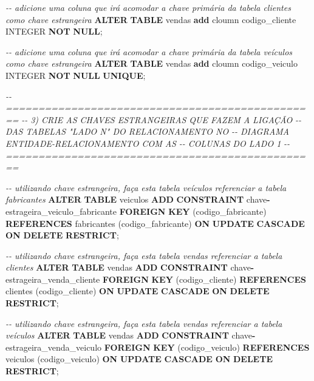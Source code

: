 \documentclass[
]{book}
\newenvironment{Shaded}{\begin{snugshade}}{\end{snugshade}}
\newcommand{\CommentTok}[1]{\textcolor[rgb]{0.56,0.35,0.01}{\textit{#1}}}
\newcommand{\DataTypeTok}[1]{\textcolor[rgb]{0.13,0.29,0.53}{#1}}
\newcommand{\KeywordTok}[1]{\textcolor[rgb]{0.13,0.29,0.53}{\textbf{#1}}}
\newcommand{\NormalTok}[1]{#1}
\newcommand{\OperatorTok}[1]{\textcolor[rgb]{0.81,0.36,0.00}{\textbf{#1}}}
\begin{document}
\begin{Shaded}
\begin{Highlighting}[]
\CommentTok{{-}{-} adicione uma coluna que irá acomodar a chave primária da tabela clientes como chave estrangeira}
\KeywordTok{ALTER} \KeywordTok{TABLE}\NormalTok{ vendas   }\KeywordTok{add}\NormalTok{ cloumn  codigo\_cliente      }\DataTypeTok{INTEGER} \KeywordTok{NOT} \KeywordTok{NULL}\NormalTok{;}

\CommentTok{{-}{-} adicione uma coluna que irá acomodar a chave primária da tabela veículos como chave estrangeira}
\KeywordTok{ALTER} \KeywordTok{TABLE}\NormalTok{ vendas   }\KeywordTok{add}\NormalTok{ cloumn  codigo\_veiculo      }\DataTypeTok{INTEGER} \KeywordTok{NOT} \KeywordTok{NULL} \KeywordTok{UNIQUE}\NormalTok{;}

\CommentTok{{-}{-} ================================================}
\CommentTok{{-}{-} 3) CRIE AS CHAVES ESTRANGEIRAS QUE FAZEM A LIGAÇÃO}
\CommentTok{{-}{-} DAS TABELAS "LADO N" DO RELACIONAMENTO NO }
\CommentTok{{-}{-} DIAGRAMA ENTIDADE{-}RELACIONAMENTO COM AS}
\CommentTok{{-}{-} COLUNAS DO LADO 1}
\CommentTok{{-}{-} ================================================}

\CommentTok{{-}{-} utilizando chave estrangeira, faça esta tabela veículos referenciar a tabela fabricantes}
\KeywordTok{ALTER} \KeywordTok{TABLE}\NormalTok{ veiculos}
    \KeywordTok{ADD} \KeywordTok{CONSTRAINT}\NormalTok{ chave}\OperatorTok{{-}}\NormalTok{estrageira\_veiculo\_fabricante}
    \KeywordTok{FOREIGN} \KeywordTok{KEY}\NormalTok{ (codigo\_fabricante)}
    \KeywordTok{REFERENCES}\NormalTok{ fabricantes (codigo\_fabricante)}
    \KeywordTok{ON} \KeywordTok{UPDATE} \KeywordTok{CASCADE}
    \KeywordTok{ON} \KeywordTok{DELETE} \KeywordTok{RESTRICT}\NormalTok{;}

\CommentTok{{-}{-} utilizando chave estrangeira, faça esta tabela vendas referenciar a tabela clientes}
\KeywordTok{ALTER} \KeywordTok{TABLE}\NormalTok{ vendas}
    \KeywordTok{ADD} \KeywordTok{CONSTRAINT}\NormalTok{ chave}\OperatorTok{{-}}\NormalTok{estrageira\_venda\_cliente}
    \KeywordTok{FOREIGN} \KeywordTok{KEY}\NormalTok{ (codigo\_cliente)}
    \KeywordTok{REFERENCES}\NormalTok{ clientes (codigo\_cliente)}
    \KeywordTok{ON} \KeywordTok{UPDATE} \KeywordTok{CASCADE}
    \KeywordTok{ON} \KeywordTok{DELETE} \KeywordTok{RESTRICT}\NormalTok{;}

\CommentTok{{-}{-} utilizando chave estrangeira, faça esta tabela vendas referenciar a tabela veículos }
\KeywordTok{ALTER} \KeywordTok{TABLE}\NormalTok{ vendas}
    \KeywordTok{ADD} \KeywordTok{CONSTRAINT}\NormalTok{ chave}\OperatorTok{{-}}\NormalTok{estrageira\_venda\_veiculo}
    \KeywordTok{FOREIGN} \KeywordTok{KEY}\NormalTok{ (codigo\_veiculo)}
    \KeywordTok{REFERENCES}\NormalTok{ veiculos (codigo\_veiculo)}
    \KeywordTok{ON} \KeywordTok{UPDATE} \KeywordTok{CASCADE}
    \KeywordTok{ON} \KeywordTok{DELETE} \KeywordTok{RESTRICT}\NormalTok{;}
\end{Highlighting}
\end{Shaded}
\end{document}
